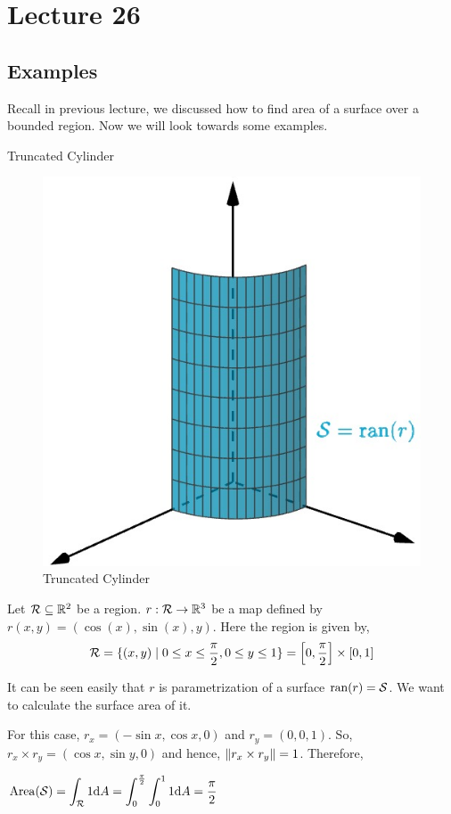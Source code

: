 \documentclass[../Analysis-3.tex]{subfiles}
\begin{document}
\chapter*{Lecture 26} %
\setcounter{chapter}{26} %
\setcounter{section}{0}

\section{Examples}
Recall in previous lecture, we discussed how to find area of a surface over a bounded region. Now we will look towards some examples.

\begin{Eg}{Truncated Cylinder}{}

  \begin{figure}
    \centering
    \includegraphics[width=.78\linewidth]{../figures/lec-26.1.png}
    \caption{Truncated Cylinder}
  \end{figure}

  Let $\mathcal{R} \subseteq \mathbb{R}^2$ be a region. $r : \mathcal{R} \to \mathbb{R}^3$ be a map defined by $r(x,y) = (\cos(x),\sin(x),y)$. Here the region is given by,
  \[\mathcal{R} = \{(x,y) \mid 0 \le x \le \frac{\pi}{2}, 0\le y \le 1\} = \qty[0,\frac{\pi}{2}] \times [0,1] \]

  It can be seen easily that $r$ is parametrization of a surface $\operatorname{ran}(r) = \mathcal{S}$. We want to calculate the surface area of it.

  For this case, $r_x = (-\sin x, \cos x, 0)$ and $r_y =(0,0,1)$. So, $ r_x \times r_y = (\cos x, \sin y, 0)$ and hence, $\norm{r_x \times r_y} = 1$. Therefore,

  $\displaystyle \operatorname{Area}(\mathcal{S}) = \int_{\mathcal{R}} 1 \dd A = \int_0^{\frac{\pi}{2}} \int_{0}^1 1 \dd A = \frac{\pi}{2}$

\end{Eg}
\end{document}
